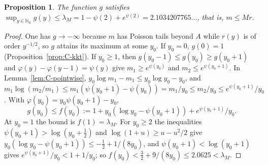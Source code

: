 \documentclass[10pt,letterpaper]{article}
\newtheorem{proposition}[theorem]{Proposition}
\begin{document}
\begin{proposition}\label{prop:C-upper}
The function $g$ satisfies $\sup_{y\in\mathbb N_0}g(y)\le\lambda_M=1-\psi(2)+e^{\psi(2)}=2.1034207765\ldots$, that is, $m\le Mr$.
\end{proposition}
\begin{proof}
One has $g\to-\infty$ because $m$ has Poisson tails beyond $A$ while $r(y)$ is of order $y^{-1/2}$, so $g$ attains its maximum at some $y_0$.
If $y_0=0$, $g(0)=1$ (Proposition~\ref{prop:C-kkt}). If $y_0\ge1$, then $g(y_0-1)\le g(y_0)\ge g(y_0+1)$ and $\varphi(y)-\varphi(y-1)=\psi(y)$ give
$m_1\ge e^{\psi(y_0)}$ and $m_2\le e^{\psi(y_0+1)}$. In Lemma~\ref{lem:C-pointwise}, $y_0\log m_1-m_1\le y_0\log y_0-y_0$, and
$m_1\log(m_2/m_1)\le m_1(\psi(y_0+1)-\psi(y_0))=m_1/y_0\le m_2/y_0\le e^{\psi(y_0+1)}/y_0$. With $\varphi(y_0)=y_0\psi(y_0+1)-y_0$,
\[
g(y_0)\le f(y_0):=1+y_0(\log y_0-\psi(y_0+1))+e^{\psi(y_0+1)}/y_0 .
\]
At $y_0=1$ the bound is $f(1)=\lambda_M$. For $y_0\ge2$ the inequalities $\psi(y_0+1)>\log(y_0+\frac12)$ and $\log(1+u)\ge u-u^2/2$ give
$y_0(\log y_0-\psi(y_0+1))\le-\frac12+1/(8y_0)$, and $\psi(y_0+1)<\log(y_0+1)$ gives $e^{\psi(y_0+1)}/y_0<1+1/y_0$; so
$f(y_0)<\frac32+9/(8y_0)\le2.0625<\lambda_M$.
\end{proof}
\end{document}
